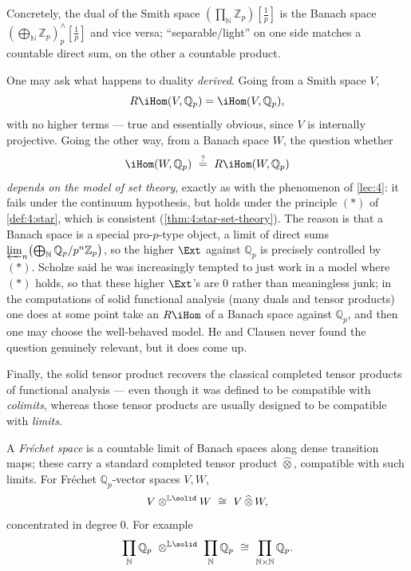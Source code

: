 Concretely, the dual of the Smith space $(\prod_{\mathbb{N}}\mathbb{Z}_p)[\tfrac1p]$
is the Banach space $(\bigoplus_{\mathbb{N}}\mathbb{Z}_p)^{\wedge}_p[\tfrac1p]$
and vice versa; ``separable/light'' on one side matches a countable direct sum,
on the other a countable product.

\begin{remark}
\label{rmk:6:derived-duality}
One may ask what happens to duality \emph{derived}. Going from a Smith space $V$,
\begin{equation*}
R\iHom(V,\mathbb{Q}_p)=\iHom(V,\mathbb{Q}_p),
\end{equation*}
with no higher terms --- true and essentially obvious, since $V$ is internally
projective. Going the other way, from a Banach space $W$, the question whether
\begin{equation*}
\iHom(W,\mathbb{Q}_p)\ \overset{?}{=}\ R\iHom(W,\mathbb{Q}_p)
\end{equation*}
\emph{depends on the model of set theory}, exactly as with the phenomenon of
\cref{lec:4}: it fails under the continuum hypothesis, but holds under the
principle $(\ast)$ of \cref{def:4:star}, which is consistent
(\cref{thm:4:star-set-theory}). The reason is that a Banach space is a special
pro-$p$-type object, a limit of direct sums
$\varprojlim_n\bigl(\bigoplus_{\mathbb{N}}\mathbb{Q}_p/p^{n}\mathbb{Z}_p\bigr)$, so
the higher $\Ext$ against $\mathbb{Q}_p$ is precisely controlled by $(\ast)$.
Scholze said he was increasingly tempted to just work in a model where $(\ast)$
holds, so that these higher $\Ext$'s are $0$ rather than meaningless junk; in the
computations of solid functional analysis (many duals and tensor products) one
does at some point take an $R\iHom$ of a Banach space against $\mathbb{Q}_p$, and
then one may choose the well-behaved model. He and Clausen never found the
question genuinely relevant, but it does come up.
\end{remark}

Finally, the solid tensor product recovers the classical completed tensor
products of functional analysis --- even though it was defined to be compatible
with \emph{colimits}, whereas those tensor products are usually designed to be
compatible with \emph{limits}.

\begin{proposition}
\label{prop:6:frechet}
A \emph{Fréchet space} is a countable limit of Banach spaces along dense
transition maps; these carry a standard completed tensor product
$\widehat{\otimes}$, compatible with such limits. For Fréchet
$\mathbb{Q}_p$-vector spaces $V,W$,
\begin{equation*}
V\otimes^{\mathbb{L}\solid}W\ \cong\ V\,\widehat{\otimes}\,W,
\end{equation*}
concentrated in degree $0$. For example
\begin{equation}
\label{eq:6:prod-Qp-tensor}
\prod_{\mathbb{N}}\mathbb{Q}_p\ \otimes^{\mathbb{L}\solid}\ \prod_{\mathbb{N}}\mathbb{Q}_p
\ \cong\ \prod_{\mathbb{N}\times\mathbb{N}}\mathbb{Q}_p .
\end{equation}
\end{proposition}

